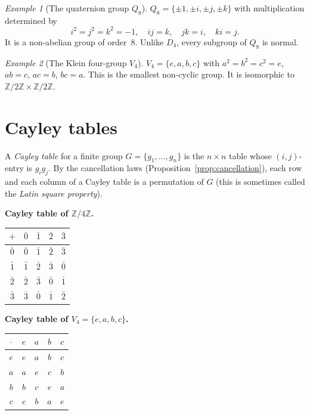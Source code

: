 \documentclass[12pt,a4paper,openany]{book}
\theoremstyle{definition}
\theoremstyle{remark}
\newtheorem{example}{Example}[chapter]
\newcommand{\Z}{\mathbb{Z}}
\begin{document}
\begin{example}[The quaternion group $Q_8$]
\label{ex:Q8}
$Q_8 = \{\pm 1, \pm i, \pm j, \pm k\}$ with multiplication determined by
\[
  i^2 = j^2 = k^2 = -1,\quad ij = k,\quad jk = i,\quad ki = j.
\]
It is a non-abelian group of order~$8$.  Unlike $D_4$, every subgroup of
$Q_8$ is normal.
\end{example}

\begin{example}[The Klein four-group $V_4$]
\label{ex:V4}
$V_4 = \{e,a,b,c\}$ with $a^2=b^2=c^2=e$, $ab=c$, $ac=b$, $bc=a$.  This
is the smallest non-cyclic group.  It is isomorphic to
$\Z/2\Z\times\Z/2\Z$.
\end{example}

\section{Cayley tables}
\label{sec:ch1-cayley}

A \emph{Cayley table} for a finite group $G=\{g_1,
\ldots,g_n\}$ is the $n\times n$ table whose $(i,j)$-entry is
$g_ig_j$.  By the cancellation laws (Proposition~\ref{prop:cancellation}),
each row and each column of a Cayley table is a permutation of $G$
(this is sometimes called the \emph{Latin square property}).

\medskip

\noindent\textbf{Cayley table of $\Z/4\Z$.}
\begin{center}
\begin{tabular}{c|cccc}
  $+$ & $\bar 0$ & $\bar 1$ & $\bar 2$ & $\bar 3$\\
  \hline
  $\bar 0$ & $\bar 0$ & $\bar 1$ & $\bar 2$ & $\bar 3$\\
  $\bar 1$ & $\bar 1$ & $\bar 2$ & $\bar 3$ & $\bar 0$\\
  $\bar 2$ & $\bar 2$ & $\bar 3$ & $\bar 0$ & $\bar 1$\\
  $\bar 3$ & $\bar 3$ & $\bar 0$ & $\bar 1$ & $\bar 2$\\
\end{tabular}
\end{center}

\medskip

\noindent\textbf{Cayley table of $V_4 = \{e,a,b,c\}$.}
\begin{center}
\begin{tabular}{c|cccc}
  $\cdot$ & $e$ & $a$ & $b$ & $c$\\
  \hline
  $e$ & $e$ & $a$ & $b$ & $c$\\
  $a$ & $a$ & $e$ & $c$ & $b$\\
  $b$ & $b$ & $c$ & $e$ & $a$\\
  $c$ & $c$ & $b$ & $a$ & $e$
\end{tabular}
\end{center}
\end{document}
